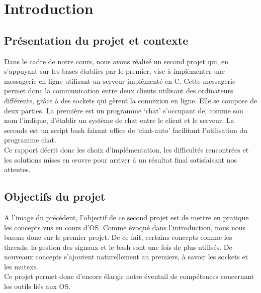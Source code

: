 \documentclass[utf8]{article}
\begin{document}
\newpage
\tableofcontents

\newpage



\section{Introduction}
\subsection{Présentation du projet et contexte}
Dans le cadre de notre cours, nous avons réalisé un second projet qui, en s'appuyant sur les bases établies par le premier, vise à implémenter une messagerie en ligne utilisant un serveur implémenté en C.
Cette messagerie permet donc la communication entre deux clients utilisant des ordinateurs différents, grâce à des sockets qui gèrent la connexion en ligne. 
Elle se compose de deux parties. La première est un programme `chat' s'occupant de, comme son nom l'indique, d'établir un système de chat entre le client et le serveur. La seconde 
est un script bash faisant office de `chat-auto' facilitant l'utilisation du programme chat. \\
Ce rapport décrit donc les choix d'implémentation, les difficultés rencontrées et les solutions mises en œuvre pour arriver à un résultat final satisfaisant nos attentes.

\subsection{Objectifs du projet}
A l'image du précédent, l'objectif de ce second projet est de mettre en pratique les concepts vus en cours d'OS. Comme évoqué dans l'introduction, nous nous basons donc
sur le premier projet. De ce fait, certains concepts comme les threads, la gestion des signaux et le bash sont une fois de plus utilisés. De nouveaux concepts s'ajoutent naturellement 
au premiers, à savoir les sockets et les mutexs. \\
Ce projet permet donc d'encore élargir notre éventail de compétences concernant les outils liés aux OS.
\end{document}
